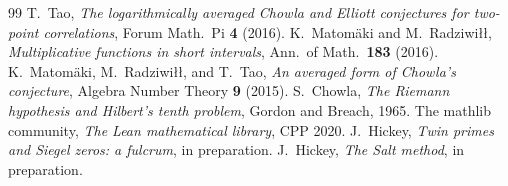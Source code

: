 \documentclass[11pt]{amsart}
\theoremstyle{remark}
\begin{document}
\begin{thebibliography}{99}
 T.~Tao, \emph{The logarithmically averaged Chowla and
Elliott conjectures for two-point correlations}, Forum Math.\ Pi
\textbf{4} (2016).
 K.~Matom\"aki and M.~Radziwi\l\l, \emph{Multiplicative
functions in short intervals}, Ann.\ of Math.\ \textbf{183} (2016).
 K.~Matom\"aki, M.~Radziwi\l\l, and T.~Tao, \emph{An
averaged form of Chowla's conjecture}, Algebra Number Theory \textbf{9}
(2015).
 S.~Chowla, \emph{The Riemann hypothesis and Hilbert's
tenth problem}, Gordon and Breach, 1965.
 The mathlib community, \emph{The Lean mathematical
library}, CPP 2020.
 J.~Hickey, \emph{Twin primes and Siegel zeros: a
fulcrum}, in preparation.
 J.~Hickey, \emph{The Salt method}, in preparation.
\end{thebibliography}
\end{document}
